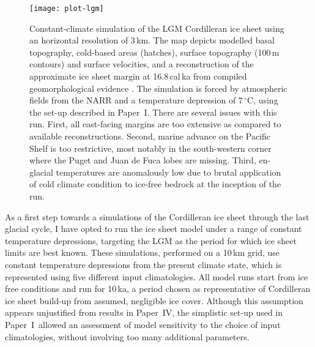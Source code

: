 \documentclass[a4paper]{kappa}
\newcommand{\unit}[1]{\ensuremath{\mathrm{#1}}}
\newcommand{\degree}[0]{\ensuremath{^{\circ}}}
\newcommand{\degC}[0]{\unit{{\degree}C}}
\newcommand{\CCLI}[0]{Paper~I}      %
\newcommand{\CCYC}[0]{Paper~IV}     %
\begin{document}
\begin{figure}
  \begin{minipage}[t]{112.5mm}\vspace{0pt}
    \texttt{[image: plot-lgm]}
  \end{minipage}%
  \hspace{1cm}%
  \begin{minipage}[t]{47.5mm}\vspace{-12pt}  %
    \caption{Constant-climate simulation of the LGM Cordilleran ice sheet using
             an horizontal resolution of 3\,km. The map depicts modelled basal
             topography, cold-based areas (hatches), surface topography (100\,m
             contours) and surface velocities, and a reconstruction of the
             approximate ice sheet margin at 16.8\,cal\,ka from compiled
             geomorphological evidence \citep[red contour;][]{Dyke.2004}.
             The simulation is forced by atmospheric
             fields from the NARR \citep{Mesinger.etal.2006} and a temperature
             depression of 7\,\degC, using the set-up described in \CCLI. There
             are several issues with this run. First, all east-facing margins
             are too extensive as compared to available reconstructions.
             Second, marine advance on the Pacific Shelf is too restrictive,
             most notably in the south-western corner where the Puget and Juan
             de Fuca lobes are missing. Third, en-glacial temperatures are
             anomalously low due to brutal application of cold climate
             condition to ice-free bedrock at the inception of the run.}
    \label{fig:plot-lgm}
  \end{minipage}
\end{figure}

As a first step towards a simulations of the Cordilleran ice sheet through the
last glacial cycle, I have opted to run the ice sheet model under a range of
constant temperature depressions, targeting the LGM as the period for which ice
sheet limits are best known. These simulations,
performed on a 10\,km grid, use constant temperature depressions
from the present climate state, which is represented using five different input
climatologies. All model runs start
from ice free conditions and run for 10\,ka, a period chosen as representative
of Cordilleran ice sheet build-up from assumed, negligible ice cover. Although
this assumption appears unjustified from results in \CCYC, the simplistic
set-up used in \CCLI\ allowed an assessment of model sensitivity to the choice
of input climatologies, without involving too many additional parameters.
\end{document}
